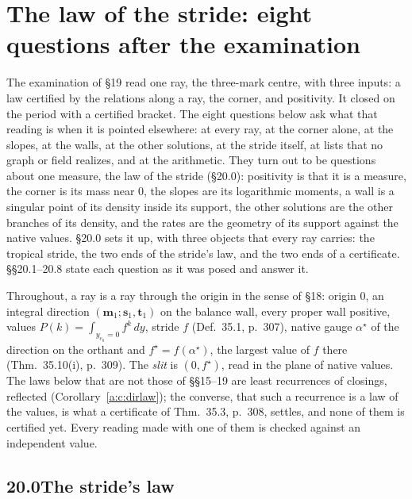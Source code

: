 \documentclass[11pt]{article}
\newcommand{\mvec}{\mathbf m}
\theoremstyle{plain}
\theoremstyle{definition}
\theoremstyle{remark}
\renewcommand{\thesection}{15}
\renewcommand{\theproposition}{15.\arabic{proposition}}
\begin{document}
\renewcommand{\thesection}{20}
\setcounter{proposition}{0}
\renewcommand{\theproposition}{20.\arabic{proposition}}

\section{The law of the stride: eight questions after the examination}

The examination of \S19 read one ray, the three-mark centre, with three inputs: a law certified by the relations along a ray, the corner, and positivity. It closed on the period with a certified bracket. The eight questions below ask what that reading is when it is pointed elsewhere: at every ray, at the corner alone, at the slopes, at the walls, at the other solutions, at the stride itself, at lists that no graph or field realizes, and at the arithmetic. They turn out to be questions about one measure, the law of the stride (\S20.0): positivity is that it is a measure, the corner is its mass near $0$, the slopes are its logarithmic moments, a wall is a singular point of its density inside its support, the other solutions are the other branches of its density, and the rates are the geometry of its support against the native values. \S20.0 sets it up, with three objects that every ray carries: the tropical stride, the two ends of the stride's law, and the two ends of a certificate. \S\S20.1--20.8 state each question as it was posed and answer it.

Throughout, a ray is a ray through the origin in the sense of \S18: origin $0$, an integral direction $(\mvec_1;\mathbf s_1,\mathbf t_1)$ on the balance wall, every proper wall positive, values $P(k)=\int_{y_{e_0}=0}f^k\,dy$, stride $f$ (Def.~35.1, p.~307), native gauge $\alpha^\star$ of the direction on the orthant and $f^\star=f(\alpha^\star)$, the largest value of $f$ there (Thm.~35.10(i), p.~309). The \emph{slit} is $(0,f^\star)$, read in the plane of native values. The laws below that are not those of \S\S15--19 are least recurrences of closings, reflected (Corollary~\ref{a:c:dirlaw}); the converse, that such a recurrence is a law of the values, is what a certificate of Thm.~35.3, p.~308, settles, and none of them is certified yet. Every reading made with one of them is checked against an independent value.

\subsection*{20.0\quad The stride's law}
\end{document}
